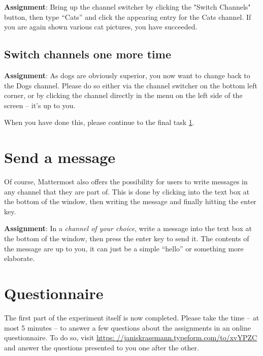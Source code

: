 \documentclass[paper=a4, fontsize=11pt]{scrartcl} %
\numberwithin{equation}{section} %
\numberwithin{figure}{section} %
\numberwithin{table}{section} %
\begin{document}
\textbf{Assignment}: Bring up the channel switcher by clicking the "Switch Channels" button, then type ``Cats'' and click the appearing entry for the Cats channel.
If you are again shown various cat pictures, you have succeeded.

\subsection{Switch channels one more time}

\textbf{Assignment}: As dogs are obviously superior, you now want to change back to the Dogs channel.
Please do so either via the channel switcher on the bottom left corner, or by clicking the channel directly in the menu on the left side of the screen -- it's up to you.

When you have done this, please continue to the final task \ref{task4}.


\section{Send a message}
\label{task4}

Of course, Mattermost also offers the possibility for users to write messages in any channel that they are part of.
This is done by clicking into the text box at the bottom of the window, then writing the message and finally hitting the enter key.

\textbf{Assignment}: In a \emph{channel of your choice}, write a message into the text box at the bottom of the window, then press the enter key to send it.
The contents of the message are up to you, it can just be a simple ``hello'' or something more elaborate.


\section{Questionnaire}
\label{questionnaire}

The first part of the experiment itself is now completed.
Please take the time -- at most 5 minutes -- to answer a few questions about the assignments in an online questionnaire.
To do so, visit \url{https: //janiskrasemann.typeform.com/to/xvYPZC} and answer the questions presented to you one after the other.
\end{document}
